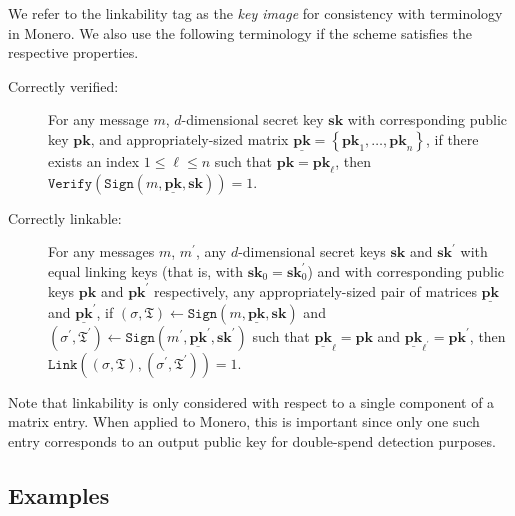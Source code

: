 \documentclass{article}
\theoremstyle{plain}
\theoremstyle{definition}
\begin{document}
We refer to the linkability tag as the \textit{key image} for consistency with terminology in Monero. We also use the following terminology if the scheme satisfies the respective properties.
\begin{description}
\item[Correctly verified:] For any message $m$, $d$-dimensional secret key $\textbf{sk}$ with corresponding public key $\textbf{pk}$, and appropriately-sized matrix $\underline{\textbf{pk}} = \left\{\textbf{pk}_1, \ldots, \textbf{pk}_n\right\}$, if there exists an index $1 \leq \ell \leq n$ such that $\textbf{pk} = \textbf{pk}_\ell$, then $\texttt{Verify}(\texttt{Sign}(m, \underline{\textbf{pk}}, \textbf{sk})) = 1$.

\item[Correctly linkable:] For any messages $m$, $m^\prime$, any $d$-dimensional secret keys  $\textbf{sk}$ and $\textbf{sk}^\prime$ with equal linking keys (that is, with $\textbf{sk}_0 = \textbf{sk}^\prime_0$) and with corresponding public keys $\textbf{pk}$ and $\textbf{pk}^\prime$ respectively, any appropriately-sized pair of matrices $\underline{\textbf{pk}}$ and $\underline{\textbf{pk}}^\prime$, if $(\sigma, \mathfrak{T}) \leftarrow \texttt{Sign}(m, \underline{\textbf{pk}}, \textbf{sk})$ and $(\sigma^\prime, \mathfrak{T}^\prime) \leftarrow \texttt{Sign}(m^\prime, \underline{\textbf{pk}}^\prime, \textbf{sk}^\prime)$ such that $\underline{\textbf{pk}}_\ell = \textbf{pk}$ and $\underline{\textbf{pk}}_{\ell^\prime} = \textbf{pk}^\prime$, then
$\texttt{Link}((\sigma, \mathfrak{T}), (\sigma^\prime, \mathfrak{T}^\prime))=1$.
\end{description}

Note that linkability is only considered with respect to a single component of a matrix entry. When applied to Monero, this is important since only one such entry corresponds to an output public key for double-spend detection purposes.



\subsection{Examples}
\end{document}

